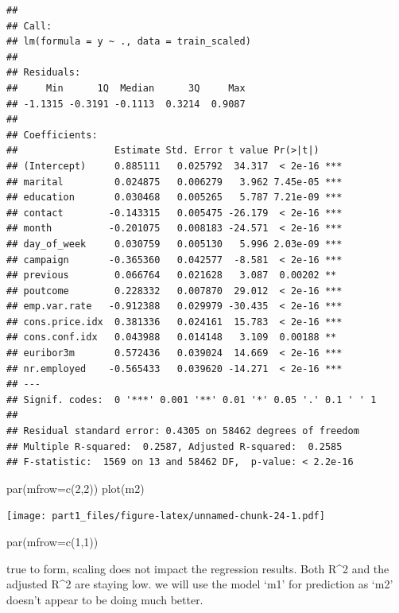 \documentclass[
]{article}
\newenvironment{Shaded}{\begin{snugshade}}{\end{snugshade}}
\newcommand{\AttributeTok}[1]{\textcolor[rgb]{0.77,0.63,0.00}{#1}}
\newcommand{\DecValTok}[1]{\textcolor[rgb]{0.00,0.00,0.81}{#1}}
\newcommand{\FunctionTok}[1]{\textcolor[rgb]{0.00,0.00,0.00}{#1}}
\newcommand{\NormalTok}[1]{#1}
\begin{document}
\begin{verbatim}
## 
## Call:
## lm(formula = y ~ ., data = train_scaled)
## 
## Residuals:
##     Min      1Q  Median      3Q     Max 
## -1.1315 -0.3191 -0.1113  0.3214  0.9087 
## 
## Coefficients:
##                 Estimate Std. Error t value Pr(>|t|)    
## (Intercept)     0.885111   0.025792  34.317  < 2e-16 ***
## marital         0.024875   0.006279   3.962 7.45e-05 ***
## education       0.030468   0.005265   5.787 7.21e-09 ***
## contact        -0.143315   0.005475 -26.179  < 2e-16 ***
## month          -0.201075   0.008183 -24.571  < 2e-16 ***
## day_of_week     0.030759   0.005130   5.996 2.03e-09 ***
## campaign       -0.365360   0.042577  -8.581  < 2e-16 ***
## previous        0.066764   0.021628   3.087  0.00202 ** 
## poutcome        0.228332   0.007870  29.012  < 2e-16 ***
## emp.var.rate   -0.912388   0.029979 -30.435  < 2e-16 ***
## cons.price.idx  0.381336   0.024161  15.783  < 2e-16 ***
## cons.conf.idx   0.043988   0.014148   3.109  0.00188 ** 
## euribor3m       0.572436   0.039024  14.669  < 2e-16 ***
## nr.employed    -0.565433   0.039620 -14.271  < 2e-16 ***
## ---
## Signif. codes:  0 '***' 0.001 '**' 0.01 '*' 0.05 '.' 0.1 ' ' 1
## 
## Residual standard error: 0.4305 on 58462 degrees of freedom
## Multiple R-squared:  0.2587, Adjusted R-squared:  0.2585 
## F-statistic:  1569 on 13 and 58462 DF,  p-value: < 2.2e-16
\end{verbatim}

\begin{Shaded}
\begin{Highlighting}[]
\FunctionTok{par}\NormalTok{(}\AttributeTok{mfrow=}\FunctionTok{c}\NormalTok{(}\DecValTok{2}\NormalTok{,}\DecValTok{2}\NormalTok{))}
\FunctionTok{plot}\NormalTok{(m2)}
\end{Highlighting}
\end{Shaded}

\texttt{[image: part1\_files/figure-latex/unnamed-chunk-24-1.pdf]}

\begin{Shaded}
\begin{Highlighting}[]
\FunctionTok{par}\NormalTok{(}\AttributeTok{mfrow=}\FunctionTok{c}\NormalTok{(}\DecValTok{1}\NormalTok{,}\DecValTok{1}\NormalTok{))}
\end{Highlighting}
\end{Shaded}

true to form, scaling does not impact the regression results. Both
R\^{}2 and the adjusted R\^{}2 are staying low. we will use the model
`m1' for prediction as `m2' doesn't appear to be doing much better.
\end{document}
